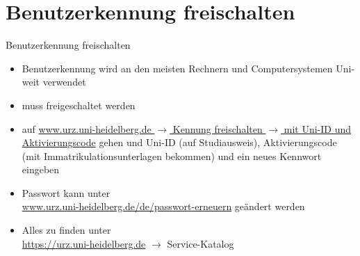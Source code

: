 





\section{Benutzerkennung freischalten}
\begin{frame}{Benutzerkennung freischalten}
    \begin{itemize}
        \item Benutzerkennung wird an den meisten Rechnern und Computersystemen Uni-weit verwendet
        \item muss freigeschaltet werden
        \item auf \textcolor{blue}{\href{https://public.urz.uni-heidelberg.de/cgi-bin/wi/freisch.php?funk=2}{www.urz.uni-heidelberg.de $\rightarrow$ Kennung freischalten $\rightarrow$ mit Uni-ID und Aktivierungscode}}
            gehen und Uni-ID (auf Studiausweis), Aktivierungscode (mit
            Immatrikulationsunterlagen bekommen) und ein neues
            Kennwort eingeben
        \item Passwort kann unter \\
        {\url{www.urz.uni-heidelberg.de/de/passwort-erneuern}}
        geändert werden
        \item Alles zu finden unter\\{\url{https://urz.uni-heidelberg.de}} $\rightarrow$ Service-Katalog
    \end{itemize}
\end{frame}

